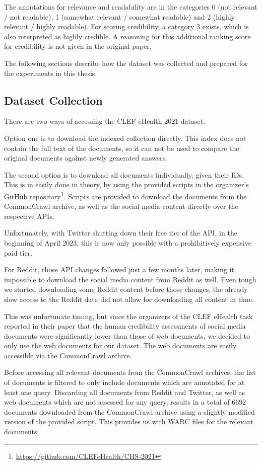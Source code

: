 The annotations for relevance and readability are in the categories 0 (not relevant / not readable), 1 (somewhat relevant / somewhat readable) and 2 (highly relevant / highly readable).
For scoring credibility, a category 3 exists, which is also interpreted as highly credible.
A reasoning for this additional ranking score for credibility is not given in the original paper.

The following sections describe how the dataset was collected and prepared for the experiments in this thesis.
\subsection{Dataset Collection}
There are two ways of accessing the CLEF eHealth 2021 dataset.

Option one is to download the indexed collection directly.
This index does not contain the full text of the documents, so it can not be used to compare the original documents against newly generated answers.

The second option is to download all documents individually, given their IDs.
This is in easily done in theory, by using the provided scripts in the organizer's GitHub repository\footnote{\url{https://github.com/CLEFeHealth/CHS-2021}}.
Scripts are provided to download the documents from the CommonCrawl archive, as well as the social media content directly over the respective APIs.

Unfortunately, with Twitter shutting down their free tier of the API, in the beginning of April 2023, this is now only possible with a prohibitively expensive paid tier.

For Reddit, those API changes followed just a few months later, making it impossible to download the social media content from Reddit as well.
Even tough we started downloading some Reddit content before those changes, the already slow access to the Reddit data did not allow for downloading all content in time.

This was unfortunate timing, but since the organizers of the CLEF eHealth task reported in their paper that the human credibility assessments of social media documents were significantly lower than those of web documents, we decided to only use the web documents for our dataset.
The web documents are easily accessible via the CommonCrawl archive.


Before accessing all relevant documents from the CommonCrawl archives, the list of documents is filtered to only include documents which are annotated for at least one query.
Discarding all documents from Reddit and Twitter, as well as web documents which are not assessed for any query, results in a total of $6692$ documents downloaded from the CommonCrawl archive using a slightly modified version of the provided script.
This provides us with WARC files for the relevant documents.

